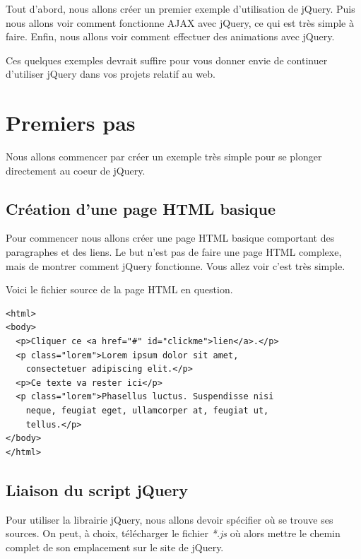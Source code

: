 \documentclass[10pt,a4paper,titlepage]{article}
\begin{document}
Tout d'abord, nous allons créer un premier exemple d'utilisation de jQuery. Puis nous allons voir comment fonctionne AJAX avec jQuery, ce qui est très simple à faire. Enfin, nous allons voir comment effectuer des animations avec jQuery.

Ces quelques exemples devrait suffire pour vous donner envie de continuer d'utiliser jQuery dans vos projets relatif au web.

\newpage
\section{Premiers pas}

Nous allons commencer par créer un exemple très simple pour se plonger directement  au coeur de jQuery.

\subsection{Création d'une page HTML basique}

Pour commencer nous allons créer une page HTML basique comportant des paragraphes et des liens. Le but n'est pas de faire une page HTML complexe, mais de montrer comment jQuery fonctionne. Vous allez voir c'est très simple.

Voici le fichier source de la page HTML en question.

\begin{lstlisting}
<html>
<body>
  <p>Cliquer ce <a href="#" id="clickme">lien</a>.</p>
  <p class="lorem">Lorem ipsum dolor sit amet,
    consectetuer adipiscing elit.</p>
  <p>Ce texte va rester ici</p>
  <p class="lorem">Phasellus luctus. Suspendisse nisi
  	neque, feugiat eget, ullamcorper at, feugiat ut,
  	tellus.</p>
</body>
</html>
\end{lstlisting}

\subsection{Liaison du script jQuery}

Pour utiliser la librairie jQuery, nous allons devoir spécifier où se trouve ses sources. On peut, à choix, télécharger le fichier \emph{*.js} où alors mettre le chemin complet de son emplacement sur le site de jQuery. \\
\end{document}
